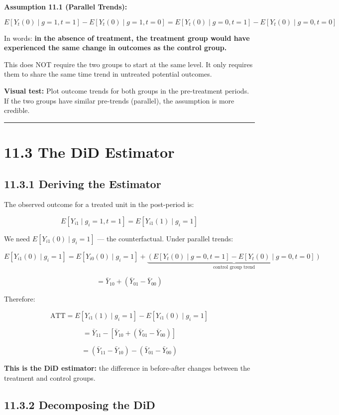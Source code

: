 \textbf{Assumption 11.1 (Parallel Trends):}

\[
E[Y_{t}(0) \mid g=1, t=1] - E[Y_{t}(0) \mid g=1, t=0] = E[Y_{t}(0) \mid g=0, t=1] - E[Y_{t}(0) \mid g=0, t=0]
\]

In words: \textbf{in the absence of treatment, the treatment group would have experienced the same change in outcomes as the control group.}

This does NOT require the two groups to start at the same level. It only requires them to share the same time trend in untreated potential outcomes.

\textbf{Visual test:} Plot outcome trends for both groups in the pre-treatment periods. If the two groups have similar pre-trends (parallel), the assumption is more credible.

\medskip\hrule\medskip

\section{11.3 The DiD Estimator}

\subsection{11.3.1 Deriving the Estimator}

The observed outcome for a treated unit in the post-period is:

\[
E[Y_{i1} \mid g_i = 1, t=1] = E[Y_{i1}(1) \mid g_i = 1]
\]

We need $E[Y_{i1}(0) \mid g_i = 1]$ --- the counterfactual. Under parallel trends:

\[
E[Y_{i1}(0) \mid g_i = 1] = E[Y_{i0}(0) \mid g_i = 1] + \underbrace{(E[Y_{t}(0) \mid g=0, t=1] - E[Y_{t}(0) \mid g=0, t=0])}_{\text{control group trend}}
\]

\[
= \bar{Y}_{10} + (\bar{Y}_{01} - \bar{Y}_{00})
\]

Therefore:

\[
\text{ATT} = E[Y_{i1}(1) \mid g_i=1] - E[Y_{i1}(0) \mid g_i=1]
\]

\[
= \bar{Y}_{11} - \left[\bar{Y}_{10} + (\bar{Y}_{01} - \bar{Y}_{00})\right]
\]

\[
= \boxed{(\bar{Y}_{11} - \bar{Y}_{10}) - (\bar{Y}_{01} - \bar{Y}_{00})}
\]

\textbf{This is the DiD estimator:} the difference in before-after changes between the treatment and control groups.

\subsection{11.3.2 Decomposing the DiD}

